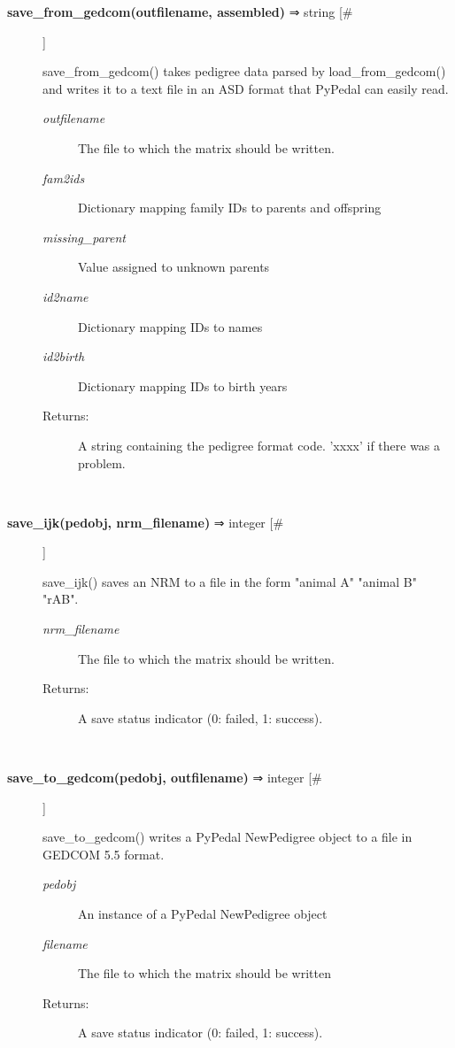 \begin{description}
\item[\textbf{save\_from\_gedcom(outfilename, assembled)} ⇒ string [\#]
]
\par save\_from\_gedcom() takes pedigree data parsed by load\_from\_gedcom() and
writes it to a text file in an ASD format that PyPedal can easily read.
\begin{description}
\item[\textit{outfilename}
]
The file to which the matrix should be written.
\item[\textit{fam2ids}
]
Dictionary mapping family IDs to parents and offspring
\item[\textit{missing\_parent}
]
Value assigned to unknown parents
\item[\textit{id2name}
]
Dictionary mapping IDs to names
\item[\textit{id2birth}
]
Dictionary mapping IDs to birth years
\item[Returns:
]
A string containing the pedigree format code. 'xxxx' if there was a problem.
\end{description}\\

\item[\textbf{save\_ijk(pedobj, nrm\_filename)} ⇒ integer [\#]
]
\par save\_ijk() saves an NRM to a file in the form "animal A" "animal B" "rAB".
\begin{description}
\item[\textit{nrm\_filename}
]
The file to which the matrix should be written.
\item[Returns:
]
A save status indicator (0: failed, 1: success).
\end{description}\\

\item[\textbf{save\_to\_gedcom(pedobj, outfilename)} ⇒ integer [\#]
]
\par save\_to\_gedcom() writes a PyPedal NewPedigree object to a file in
GEDCOM 5.5 format.
\begin{description}
\item[\textit{pedobj}
]
An instance of a PyPedal NewPedigree object
\item[\textit{filename}
]
The file to which the matrix should be written
\item[Returns:
]
A save status indicator (0: failed, 1: success).
\end{description}\\


\end{description}
